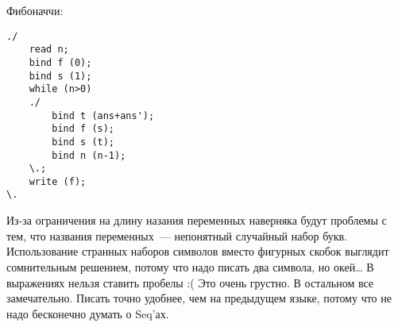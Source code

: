 \documentclass[10pt]{article}
\begin{document}
Фибоначчи:

\begin{verbatim}
./
    read n;
    bind f (0);
    bind s (1);
    while (n>0)
    ./
        bind t (ans+ans');
        bind f (s);
        bind s (t);
        bind n (n-1);
    \.;
    write (f);
\.
\end{verbatim}



Из-за ограничения на длину назания переменных наверняка будут проблемы с тем,
что названия переменных~--- непонятный случайный набор букв.
Использование странных наборов символов вместо фигурных скобок выглядит сомнительным решением,
потому что надо писать два символа, но окей\ldots
В выражениях нельзя ставить пробелы :( Это очень грустно.
В остальном все замечательно. Писать точно удобнее, чем на предыдущем языке, потому что не надо бесконечно думать о Seq'ах.


\label{LastPage}
\end{document}
